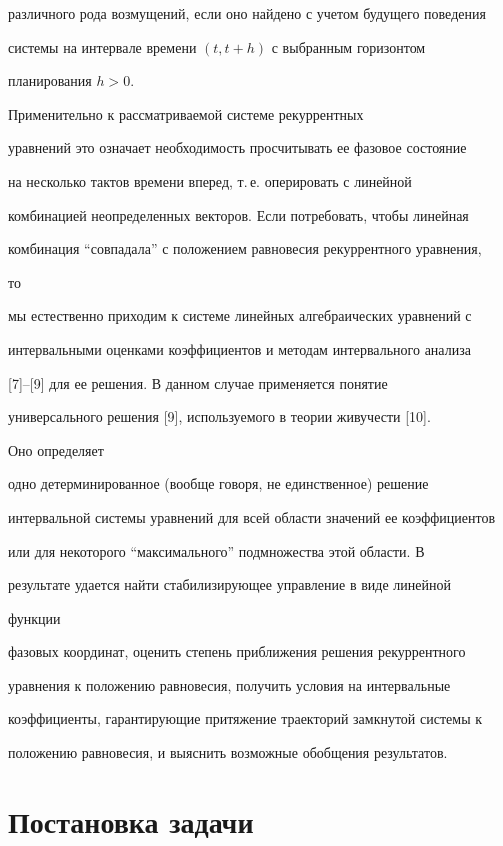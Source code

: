 различного рода возмущений, если оно найдено с учетом будущего поведения 


системы на интервале времени $(t,t+h)$ с выбранным горизонтом 


планирования $h>0$. 


Применительно к рассматриваемой системе рекуррентных 


уравнений это означает необходимость просчитывать ее фазовое состояние 


на несколько тактов времени вперед, т.\,е. оперировать с линейной 


комбинацией неопределенных векторов. Если потребовать, чтобы линейная 


комбинация ``совпадала'' с положением равновесия рекуррентного уравнения, 


то 


мы естественно приходим к системе линейных алгебраических уравнений с 


интервальными оценками коэффициентов и методам интервального анализа 


[7]--[9] для ее решения. В данном случае применяется понятие 


универсального решения [9], используемого в теории живучести [10]. 


Оно определяет 


одно детерминированное (вообще говоря, не единственное) решение 


интервальной системы уравнений для всей области значений ее коэффициентов 


или для некоторого ``максимального'' подмножества этой области. В 


результате удается найти стабилизирующее управление в виде линейной 


функции 


фазовых координат, оценить степень приближения решения рекуррентного 


уравнения к положению равновесия, получить условия на интервальные 


коэффициенты, гарантирующие притяжение траекторий замкнутой системы к 


положению равновесия, и выяснить возможные обобщения результатов. 


 


\section{Постановка задачи} 


